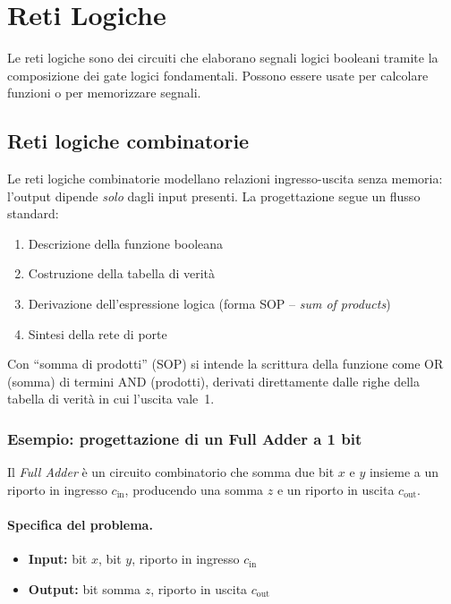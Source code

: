 \section{Reti Logiche}
Le reti logiche sono dei circuiti che elaborano segnali logici booleani tramite la composizione dei gate logici fondamentali. Possono essere usate per calcolare funzioni o per memorizzare segnali.

\subsection{Reti logiche combinatorie}
\label{subsec:reti-comb}

Le reti logiche combinatorie modellano relazioni ingresso-uscita senza memoria: l'output dipende \emph{solo} dagli input presenti. La progettazione segue un flusso standard:

\begin{enumerate}
    \item Descrizione della funzione booleana
    \item Costruzione della tabella di verità
    \item Derivazione dell'espressione logica (forma SOP -- \textit{sum of products})
    \item Sintesi della rete di porte
\end{enumerate}

Con ``somma di prodotti'' (SOP) si intende la scrittura della funzione come OR (somma) di termini AND (prodotti), derivati direttamente dalle righe della tabella di verità in cui l'uscita vale~1.

\subsubsection*{Esempio: progettazione di un Full Adder a 1 bit}
\label{subsec:fa1-progetto}

Il \textit{Full Adder} è un circuito combinatorio che somma due bit $x$ e $y$ insieme a un riporto in ingresso $c_{\text{in}}$, producendo una somma $z$ e un riporto in uscita $c_{\text{out}}$.

\paragraph{Specifica del problema.}
\begin{itemize}
    \item \textbf{Input:} bit $x$, bit $y$, riporto in ingresso $c_{\text{in}}$
    \item \textbf{Output:} bit somma $z$, riporto in uscita $c_{\text{out}}$
\end{itemize}

